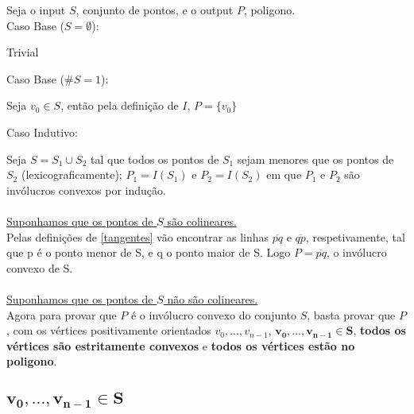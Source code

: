 \documentclass[11pt]{article}
\begin{document}
Seja o input $S$, conjunto de pontos, e o output $P$, poligono.\\
Caso Base ($S = \emptyset$):\par
\hfill\begin{minipage}{\dimexpr\textwidth-1cm}
    Trivial\\
\end{minipage}
Caso Base ($\#S = 1$):\par
\hfill\begin{minipage}{\dimexpr\textwidth-1cm}
    Seja $v_0 \in S$, então pela definição de $I$, $P = \{v_0\}$\\
\end{minipage}
Caso Indutivo:\par
\hfill\begin{minipage}{\dimexpr\textwidth-1cm}
    Seja $S = S_1 \cup S_2$ tal que todos os pontos de $S_1$
    sejam menores que os pontos de $S_2$ (lexicograficamente); 
    $P_1 = I(S_1)$ e $P_2 = I(S_2)$ em que $P_1$ e $P_2$ são 
    invólucros convexos por indução.\\\\
    
    \underline{Suponhamos que os pontos de $S$ são colineares.}\\
    Pelas definições de \ref{tangentes} vão encontrar as linhas 
    $\overline{p q}$ e $\overline{q p}$, respetivamente,
    tal que p é o ponto menor de S, e q o ponto maior de S. 
    Logo $P = \overline{p q}$, o invólucro convexo de S.\\\\

    \underline{Suponhamos que os pontos de $S$ não são colineares.}\\
    Agora para provar que $P$ é o invólucro convexo
    do conjunto $S$, basta provar que $P$, com os vértices 
    positivamente orientados $v_0,...,v_{n-1}$, $\mathbf{v_0,...,v_{n-1} \in S}$, 
    \textbf{todos os vértices são estritamente convexos} e 
    \textbf{todos os vértices estão no poligono}.\\
    
    
    
\end{minipage}

\subsection{$\mathbf{v_0,...,v_{n-1} \in S}$}
\end{document}
